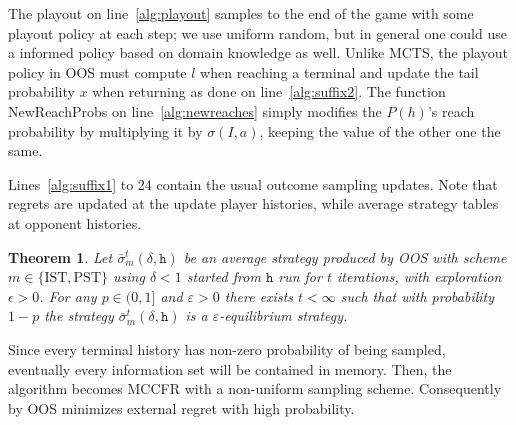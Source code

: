 \documentclass[letterpaper]{article}
\newcommand{\cP}{\mathcal{P}}
\newcommand{\tth}{\mathtt{h}}
\newtheorem{theorem}{Theorem}
\newcounter{mlNoteCounter}
\newcommand{\mlnote}[1]{{\scriptsize \color{darkgreen} $\blacksquare$ \refstepcounter{mlNoteCounter}\textsf{[ML]$_{\arabic{mlNoteCounter}}$:{#1}}}}
\begin{document}

The playout on line~\ref{alg:playout} samples to the end of the game with some playout policy at each step; we use uniform random, 
but in general one could use a informed policy based on domain knowledge as well. 
Unlike MCTS, the playout policy in OOS must compute $l$ when reaching a terminal and update the tail probability $x$ when returning
as done on line~\ref{alg:suffix2}. The function NewReachProbs on line~\ref{alg:newreaches} simply modifies the $P(h)$'s reach 
probability by multiplying it by $\sigma(I,a)$, keeping the value of the other one the same.

Lines~\ref{alg:suffix1} to 24
contain the usual outcome sampling updates. Note that regrets are updated at the 
update player histories, while average strategy tables at opponent histories. 

\begin{theorem}
Let $\bar{\sigma}^t_m(\delta,\tth)$ be an average strategy produced by OOS with scheme $m \in \{ \mbox{IST}, \mbox{PST} \}$ 
using $\delta < 1$ started from $\tth$ run for $t$ iterations, with exploration $\epsilon > 0$.  
For any $p \in (0, 1]$ and $\varepsilon > 0$ there exists $t < \infty$ such that with probability $1-p$ the strategy  $\bar{\sigma}^t_m(\delta,\tth)$ is a $\varepsilon$-equilibrium strategy. 
\label{thm:consistency}
\end{theorem}
Since every terminal history has non-zero probability of being sampled, eventually every information 
set will be contained in memory. Then, the algorithm becomes MCCFR with a non-uniform sampling scheme.
Consequently by \cite[Theorem 5]{Lanctot09Sampling} OOS minimizes external regret with high probability.
\end{document}
